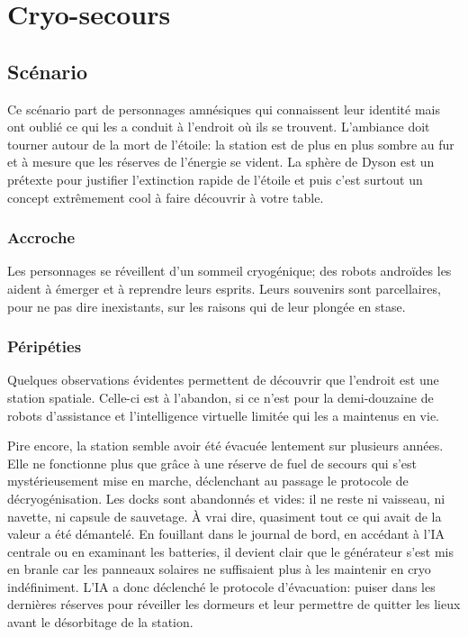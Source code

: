 \chapter{Cryo-secours}

\section{Scénario}

Ce scénario part de personnages amnésiques qui connaissent leur identité mais ont oublié ce qui les a conduit à l'endroit où ils se trouvent.
L'ambiance doit tourner autour de la mort de l'étoile: la station est de plus en plus sombre au fur et à mesure que les réserves de l'énergie se vident.
La sphère de Dyson est un prétexte pour justifier l'extinction rapide de l'étoile et puis c'est surtout un concept extrêmement cool à faire découvrir à votre table.

\subsection{Accroche}

Les personnages se réveillent d'un sommeil cryogénique; des robots androïdes les aident à émerger et à reprendre leurs esprits.
Leurs souvenirs sont parcellaires, pour ne pas dire inexistants, sur les raisons qui de leur plongée en stase.

\subsection{Péripéties}

Quelques observations évidentes permettent de découvrir que l'endroit est une station spatiale.
Celle-ci est à l'abandon, si ce n'est pour la demi-douzaine de robots d'assistance et l'intelligence virtuelle limitée qui les a maintenus en vie.

Pire encore, la station semble avoir été évacuée lentement sur plusieurs années.
Elle ne fonctionne plus que grâce à une réserve de fuel de secours qui s'est mystérieusement mise en marche, déclenchant au passage le protocole de décryogénisation.
Les docks sont abandonnés et vides: il ne reste ni vaisseau, ni navette, ni capsule de sauvetage.
À vrai dire, quasiment tout ce qui avait de la valeur a été démantelé.
En fouillant dans le journal de bord, en accédant à l'IA centrale ou en examinant les batteries, il devient clair que le générateur s'est mis en branle car les panneaux solaires ne suffisaient plus à les maintenir en cryo indéfiniment.
L'IA a donc déclenché le protocole d'évacuation: puiser dans les dernières réserves pour réveiller les dormeurs et leur permettre de quitter les lieux avant le désorbitage de la station.

